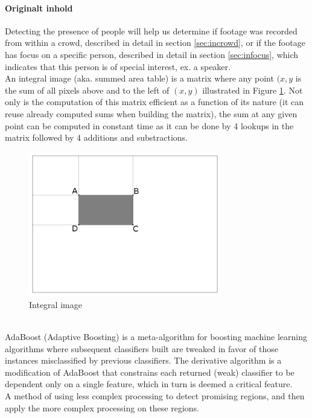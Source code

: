\paragraph{Originalt inhold}
Detecting the presence of people will help us determine if footage was recorded from within a crowd, described in detail in section \ref{sec:incrowd}, or if the footage has focus on a specific person, described in detail in section \ref{sec:infocus}, which indicates that this person is of special interest, ex. a speaker.\\
An integral image (aka. summed area table) is a matrix where any point $(x,y$ is the sum of all pixels above and to the left of $(x,y)$ illustrated in Figure \ref{fig:integral_img}. Not only is the computation of this matrix efficient as a function of its nature (it can reuse already computed sums when building the matrix), the sum at any given point can be computed in constant time as it can be done by 4 lookups in the matrix followed by 4 additions and substractions.
%
\begin{figure}[h]
     \centering
     \includegraphics[width=0.75\textwidth]{img/integral_image.png}
     \caption{Integral image}\label{fig:integral_img}
\end{figure}\\
%
AdaBoost (Adaptive Boosting) is a meta-algorithm for boosting machine learning algorithms where subsequent classifiers built are tweaked in favor of those instances misclassified by previous classifiers. The derivative algorithm is a modification of AdaBoost that constrains each returned (weak) classifier to be dependent only on a single feature, which in turn is deemed a critical feature.\\
A method of using less complex processing to detect promising regions, and then apply the more complex processing on these regions.\\\\
